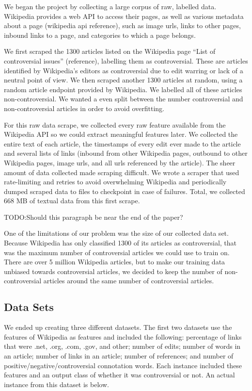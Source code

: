 \documentclass{article}
\begin{document}
We began the project by collecting a large corpus of raw, labelled data. 
Wikipedia provides a web API to access their pages, as well as various metadata about a page (wikipedia api reference), such as image urls, links to other pages, inbound links to a page, and categories to which a page belongs. 

We first scraped the 1300 articles listed on the Wikipedia page “List of controversial issues” (reference), labelling them as controversial. 
These are articles identified by Wikipedia’s editors as controversial due to edit warring or lack of a neutral point of view.
We then scraped another 1300 articles at random, using a random article endpoint provided by Wikipedia. 
We labelled all of these articles non-controversial. 
We wanted a even split between the number controversial and non-controversial articles in order to avoid overfitting.

For this raw data scrape, we collected every raw feature available from the Wikipedia API so we could extract meaningful features later. We collected the entire text of each article, the timestamps of every edit ever made to the article and several lists of links (inbound from other Wikipedia pages, outbound to other Wikipedia pages, image urls, and all urls referenced by the article). The sheer amount of data collected made scraping difficult. We wrote a scraper that used rate-limiting and retries to avoid overwhelming Wikipedia and periodically dumped scraped data to files to checkpoint in case of failures. Total, we collected 668 MB of textual data from this first scrape.

TODO:Should this paragraph be near the end of the paper?

One of the limitations of our problem was the size of our collected data set. 
Because Wikipedia has only classified 1300 of its articles as controversial, that was the maximum number of controversial articles we could use to train on. 
There are over 5 million Wikipedia articles, but to make our training data unbiased towards controversial articles, we decided to keep the number of non-controversial articles around the same number of controversial articles. 

\subsection{Data Sets}

We ended up creating three different datasets. 
The first two datasets use the features of Wikipedia as features and included the following: percentage of links that were .net, .org, .com, .gov, and other; number of edits; number of words in an article; number of links in an article; number of references; and number of positive/negative/controversial connotation words. 
Each instance included these features and an output class of whether it was controversial or not. 
An actual instance from this dataset is below.
\end{document}
